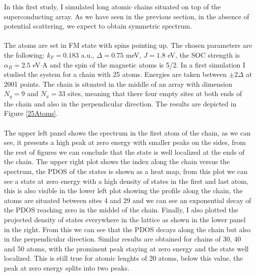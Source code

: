 \documentclass[letterpaper,12pt]{article}
\begin{document}
In this first study, I simulated long atomic chains situated on top of the superconducting array. As we have seen in the previous section, in the absence of potential scattering, we expect to obtain symmetric spectrum.\\ \\
The atoms are set in FM state with spins pointing up. The chosen parameters are the following: $k_F = 0.183$ a.u., $\Delta = 0.75$ meV, $J = 1.8$ eV, the SOC strength is $\alpha_R = 2.5$ eV$\cdot$A and the spin of the magnetic atoms is 5/2. In a first simulation I studied the system for a chain with 25 atoms. Energies are taken between $\pm 2\Delta$ at 2001 points. The chain is situated in the middle of an array with dimension $N_y = 9$ and $N_x = 33$ sites, meaning that there four empty sites at both ends of the chain and also in the perpendicular direction. The results are depicted in Figure \ref{25Atoms}.\\ \\ 
The upper left panel shows the spectrum in the first atom of the chain, as we can see, it presents a high peak at zero energy with smaller peaks on the sides, from the rest of figures we can conclude that the state is well localized at the ends of the chain. The upper right plot shows the index along the chain versus the spectrum, the PDOS of the states is shown as a heat map, from this plot we can see a state at zero energy with a high density of states in the first and last atom, this is also visible in the lower left plot showing the profile along the chain, the atoms are situated between sites 4 and 29 and we can see an exponential decay of the PDOS reaching zero in the middel of the chain. Finally, I also plotted the projected density of states everywhere in the lattice as shown in the lower panel in the right. From this we can see that the PDOS decays along the chain but also in the perpendicular direction. Similar results are obtained for chains of 30, 40 and 50 atoms, with the prominent peak staying at zero energy and the state well localized. This is still true for atomic lenghts of 20 atoms, below this value, the peak at zero energy splits into two peaks.\\ \\
\end{document}
